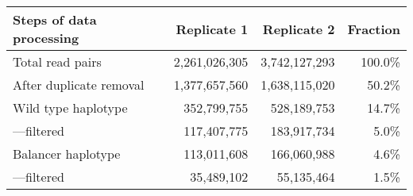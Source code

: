 \begin{table}[ht]
    \centering
    \begin{tabu}{lrrr}
        \toprule
        Steps of data processing & Replicate 1 & Replicate 2 & Fraction \\
        \midrule
        Total read pairs                  & 2,261,026,305 & 3,742,127,293 & 100.0\% \\
        After duplicate removal           & 1,377,657,560 & 1,638,115,020 &  50.2\% \\
        Wild type haplotype               &   352,799,755 &   528,189,753 &  14.7\% \\
        \quad ---filtered                 &   117,407,775 &   183,917,734 &   5.0\% \\
        Balancer haplotype                &   113,011,608 &   166,060,988 &   4.6\% \\
        \quad ---filtered                 &    35,489,102 &    55,135,464 &   1.5\% \\
        \bottomrule
    \end{tabu}
\end{table}
